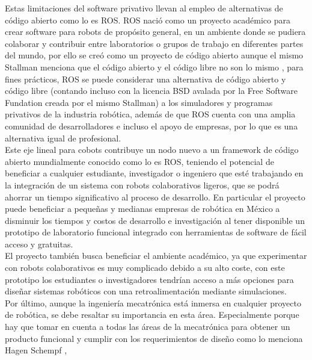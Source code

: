 Estas limitaciones del software privativo llevan al empleo de alternativas de código abierto como lo es ROS. ROS nació como un proyecto académico para crear software para robots de propósito general, en un ambiente donde se pudiera colaborar y contribuir entre laboratorios o grupos de trabajo en diferentes partes del mundo, por ello se creó como un proyecto de código abierto aunque el mismo Stallman menciona que el código abierto y el código libre no son lo mismo \cite{Referencia2} , para fines prácticos, ROS se puede considerar una alternativa de código abierto y código libre (contando incluso con la licencia BSD avalada por la Free Software Fundation creada por el mismo Stallman) a los simuladores y programas privativos de la industria robótica, además de que ROS cuenta con una amplia comunidad de desarrolladores e incluso el apoyo de empresas, por lo que es una alternativa igual de profesional. 
\\Este eje lineal para cobots contribuye un nodo nuevo a un framework de código abierto mundialmente conocido como lo es ROS, teniendo el potencial de beneficiar a cualquier estudiante, investigador o ingeniero que esté trabajando en la integración de un sistema con robots colaborativos ligeros, que se podrá ahorrar un tiempo significativo al proceso de desarrollo. En particular el proyecto puede beneficiar a pequeñas y medianas empresas de robótica en México a disminuir los tiempos y costos de desarrollo e investigación al tener disponible un prototipo de laboratorio funcional integrado con herramientas de software de fácil acceso y gratuitas.
\\El proyecto también busca beneficiar el ambiente académico, ya que experimentar con robots colaborativos es muy complicado debido a su alto coste, con este prototipo los estudiantes o investigadores tendrían acceso a más opciones para diseñar sistemas robóticos con una retroalimentación mediante simulaciones.
\\Por último, aunque la ingeniería mecatrónica está inmersa en cualquier proyecto de robótica, se debe resaltar su importancia en esta área. Especialmente porque hay que tomar en cuenta a todas las áreas de la mecatrónica para obtener un producto funcional y cumplir con los requerimientos de diseño como lo menciona Hagen Schempf \cite{Referencia3}, 
